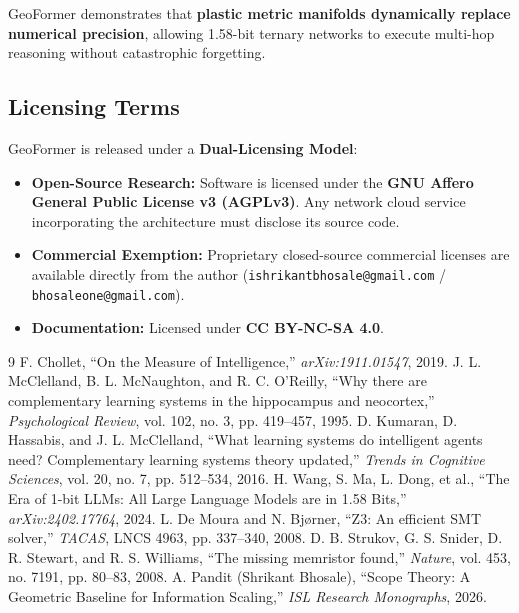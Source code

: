 \documentclass[11pt,a4paper]{article}
\begin{document}
GeoFormer demonstrates that \textbf{plastic metric manifolds dynamically replace numerical precision}, allowing 1.58-bit ternary networks to execute multi-hop reasoning without catastrophic forgetting.

\subsection{Licensing Terms}
GeoFormer is released under a \textbf{Dual-Licensing Model}:
\begin{itemize}[leftmargin=1.5em]
    \item \textbf{Open-Source Research:} Software is licensed under the \textbf{GNU Affero General Public License v3 (AGPLv3)}. Any network cloud service incorporating the architecture must disclose its source code.
    \item \textbf{Commercial Exemption:} Proprietary closed-source commercial licenses are available directly from the author (\texttt{ishrikantbhosale@gmail.com} / \texttt{bhosaleone@gmail.com}).
    \item \textbf{Documentation:} Licensed under \textbf{CC BY-NC-SA 4.0}.
\end{itemize}

\begin{thebibliography}{9}
 F. Chollet, ``On the Measure of Intelligence,'' \textit{arXiv:1911.01547}, 2019.
 J. L. McClelland, B. L. McNaughton, and R. C. O'Reilly, ``Why there are complementary learning systems in the hippocampus and neocortex,'' \textit{Psychological Review}, vol. 102, no. 3, pp. 419--457, 1995.
 D. Kumaran, D. Hassabis, and J. L. McClelland, ``What learning systems do intelligent agents need? Complementary learning systems theory updated,'' \textit{Trends in Cognitive Sciences}, vol. 20, no. 7, pp. 512--534, 2016.
 H. Wang, S. Ma, L. Dong, et al., ``The Era of 1-bit LLMs: All Large Language Models are in 1.58 Bits,'' \textit{arXiv:2402.17764}, 2024.
 L. De Moura and N. Bj{\o}rner, ``Z3: An efficient SMT solver,'' \textit{TACAS}, LNCS 4963, pp. 337--340, 2008.
 D. B. Strukov, G. S. Snider, D. R. Stewart, and R. S. Williams, ``The missing memristor found,'' \textit{Nature}, vol. 453, no. 7191, pp. 80--83, 2008.
 A. Pandit (Shrikant Bhosale), ``Scope Theory: A Geometric Baseline for Information Scaling,'' \textit{ISL Research Monographs}, 2026.
\end{thebibliography}
\end{document}
